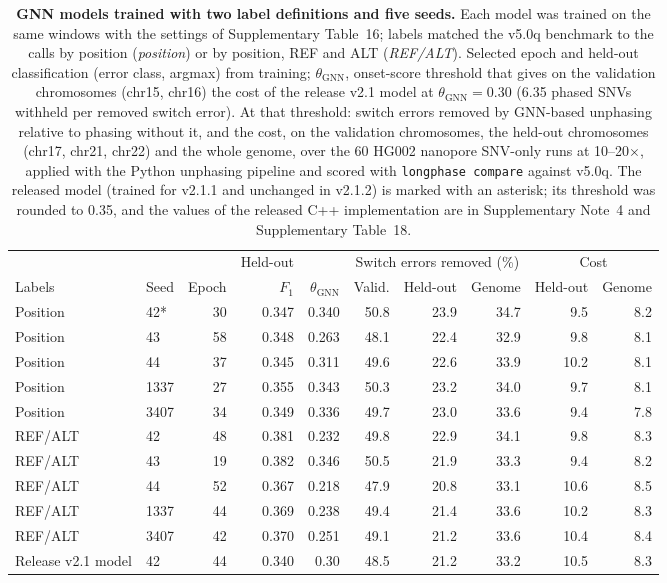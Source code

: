 \documentclass[11pt,a4paper]{article}
\newcommand{\code}[1]{\texttt{\small #1}}
\begin{document}
\begin{table}[h]
\caption{\textbf{GNN models trained with two label definitions and five seeds.} Each model was trained on the same windows with the settings of Supplementary Table~16; labels matched the v5.0q benchmark to the calls by position (\emph{position}) or by position, REF and ALT (\emph{REF/ALT}). Selected epoch and held-out classification (error class, argmax) from training; $\theta_{\mathrm{GNN}}$, onset-score threshold that gives on the validation chromosomes (chr15, chr16) the cost of the release v2.1 model at $\theta_{\mathrm{GNN}}=0.30$ (6.35 phased SNVs withheld per removed switch error). At that threshold: switch errors removed by GNN-based unphasing relative to phasing without it, and the cost, on the validation chromosomes, the held-out chromosomes (chr17, chr21, chr22) and the whole genome, over the 60 HG002 nanopore SNV-only runs at 10--20$\times$, applied with the Python unphasing pipeline and scored with \code{longphase compare} against v5.0q. The released model (trained for v2.1.1 and unchanged in v2.1.2) is marked with an asterisk; its threshold was rounded to 0.35, and the values of the released C++ implementation are in Supplementary Note~4 and Supplementary Table~18.}\label{tab:seeds}
\small
\setlength{\tabcolsep}{5pt}
\begin{tabular}{@{}llrrrrrrrr@{}}
\toprule
 & & & Held-out & & \multicolumn{3}{c}{Switch errors removed (\%)} & \multicolumn{2}{c}{Cost} \\
\cmidrule(lr){6-8}\cmidrule(l){9-10}
Labels & Seed & Epoch & $F_1$ & $\theta_{\mathrm{GNN}}$ & Valid. & Held-out & Genome & Held-out & Genome \\
\midrule
Position & 42* & 30 & 0.347 & 0.340 & 50.8 & 23.9 & 34.7 & 9.5 & 8.2 \\
Position & 43 & 58 & 0.348 & 0.263 & 48.1 & 22.4 & 32.9 & 9.8 & 8.1 \\
Position & 44 & 37 & 0.345 & 0.311 & 49.6 & 22.6 & 33.9 & 10.2 & 8.1 \\
Position & 1337 & 27 & 0.355 & 0.343 & 50.3 & 23.2 & 34.0 & 9.7 & 8.1 \\
Position & 3407 & 34 & 0.349 & 0.336 & 49.7 & 23.0 & 33.6 & 9.4 & 7.8 \\
\addlinespace
REF/ALT & 42 & 48 & 0.381 & 0.232 & 49.8 & 22.9 & 34.1 & 9.8 & 8.3 \\
REF/ALT & 43 & 19 & 0.382 & 0.346 & 50.5 & 21.9 & 33.3 & 9.4 & 8.2 \\
REF/ALT & 44 & 52 & 0.367 & 0.218 & 47.9 & 20.8 & 33.1 & 10.6 & 8.5 \\
REF/ALT & 1337 & 44 & 0.369 & 0.238 & 49.4 & 21.4 & 33.6 & 10.2 & 8.3 \\
REF/ALT & 3407 & 42 & 0.370 & 0.251 & 49.1 & 21.2 & 33.6 & 10.4 & 8.4 \\
\addlinespace
Release v2.1 model & 42 & 44 & 0.340 & 0.30 & 48.5 & 21.2 & 33.2 & 10.5 & 8.3 \\
\bottomrule
\end{tabular}
\end{table}
\FloatBarrier
\end{document}

